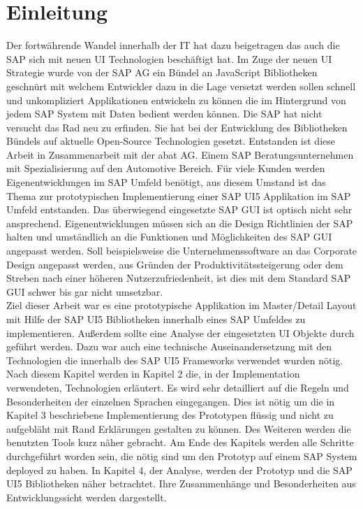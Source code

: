 \section{Einleitung}\label{einleitung}
Der fortwährende Wandel innerhalb der IT hat dazu beigetragen das auch die SAP sich mit neuen UI Technologien beschäftigt hat. Im Zuge der neuen UI Strategie wurde von der SAP AG ein Bündel an JavaScript Bibliotheken geschnürt mit welchem Entwickler dazu in die Lage versetzt werden sollen schnell und unkompliziert Applikationen entwickeln zu können die im Hintergrund von jedem SAP System mit Daten bedient werden können. Die SAP hat nicht versucht das Rad neu zu erfinden. Sie hat bei der Entwicklung des Bibliotheken Bündels auf aktuelle Open-Source Technologien gesetzt. Entstanden ist diese Arbeit in Zusammenarbeit mit der abat AG. Einem SAP Beratungsunternehmen mit Spezialisierung auf den Automotive Bereich. Für viele Kunden werden Eigenentwicklungen im SAP Umfeld benötigt, aus diesem Umstand ist das Thema zur prototypischen Implementierung einer SAP UI5 Applikation im SAP Umfeld entstanden. Das überwiegend eingesetzte SAP GUI ist optisch nicht sehr ansprechend. Eigenentwicklungen müssen sich an die Design Richtlinien der SAP halten und umständlich an die Funktionen und Möglichkeiten des SAP GUI angepasst werden. Soll beispielsweise die Unternehmenssoftware an das Corporate Design angepasst werden, aus Gründen der Produktivitätssteigerung oder dem Streben nach einer höheren Nutzerzufriedenheit, ist dies mit dem Standard SAP GUI schwer bis gar nicht umsetzbar.\\
Ziel dieser Arbeit war es eine prototypische Applikation im Master/Detail Layout mit Hilfe der SAP UI5 Bibliotheken innerhalb eines SAP Umfeldes zu implementieren. Außerdem sollte eine Analyse der eingesetzten UI Objekte durch geführt werden. Dazu war auch eine technische Auseinandersetzung mit den Technologien die innerhalb des SAP UI5 Frameworks verwendet wurden nötig.\\
Nach diesem Kapitel werden in Kapitel 2 die, in der Implementation verwendeten, Technologien erläutert. Es wird sehr detailliert auf die Regeln und Besonderheiten der einzelnen Sprachen eingegangen. Dies ist nötig um die in Kapitel 3 beschriebene Implementierung des Prototypen flüssig und nicht zu aufgebläht mit Rand Erklärungen gestalten zu können.  Des Weiteren werden die benutzten Tools kurz näher gebracht. Am Ende des Kapitels werden alle Schritte durchgeführt worden sein, die nötig sind um den Prototyp auf einem SAP System deployed zu haben. In Kapitel 4, der Analyse, werden der Prototyp und die SAP UI5 Bibliotheken näher betrachtet. Ihre Zusammenhänge und Besonderheiten aus Entwicklungssicht werden dargestellt.